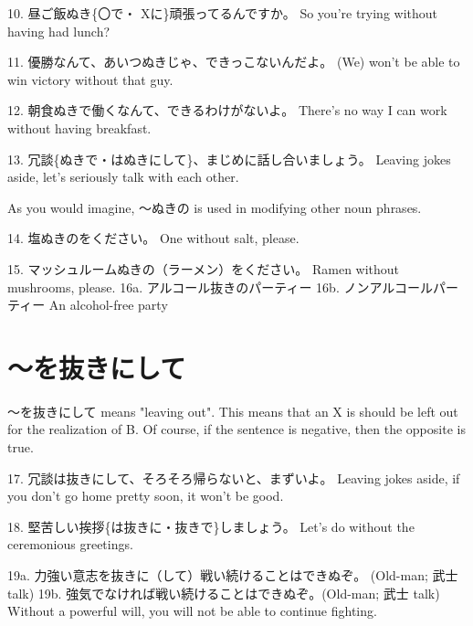 \par{10. 昼ご飯ぬき\{〇で・ Xに\}頑張ってるんですか。 \hfill\break
So you're trying without having had lunch? }

\par{11. 優勝なんて、あいつぬきじゃ、できっこないんだよ。 \hfill\break
(We) won't be able to win victory without that guy. }

\par{12. 朝食ぬきで働くなんて、できるわけがないよ。 \hfill\break
There's no way I can work without having breakfast. }

\par{13. 冗談\{ぬきで・はぬきにして\}、まじめに話し合いましょう。 \hfill\break
Leaving jokes aside, let's seriously talk with each other. }

\par{ As you would imagine, ～ぬきの is used in modifying other noun phrases. }

\par{14. 塩ぬきのをください。 \hfill\break
One without salt, please. }

\par{15. マッシュルームぬきの（ラーメン）をください。 \hfill\break
Ramen without mushrooms, please. }
16a. アルコール抜きのパーティー \hfill\break
16b. ノンアルコールパーティー \hfill\break
An alcohol-free party       
\section{～を抜きにして}
 
\par{ ～を抜きにして means "leaving out". This means that an X is should be left out for the realization of B. Of course, if the sentence is negative, then the opposite is true. }

\par{17. 冗談は抜きにして、そろそろ帰らないと、まずいよ。 \hfill\break
Leaving jokes aside, if you don't go home pretty soon, it won't be good. }

\par{18. 堅苦しい挨拶\{は抜きに・抜きで\}しましょう。 \hfill\break
Let's do without the ceremonious greetings. }

\par{19a. 力強い意志を抜きに（して）戦い続けることはできぬぞ。 (Old-man; 武士 talk) \hfill\break
19b. 強気でなければ戦い続けることはできぬぞ。(Old-man; 武士 talk) \hfill\break
Without a powerful will, you will not be able to continue fighting.  }
    